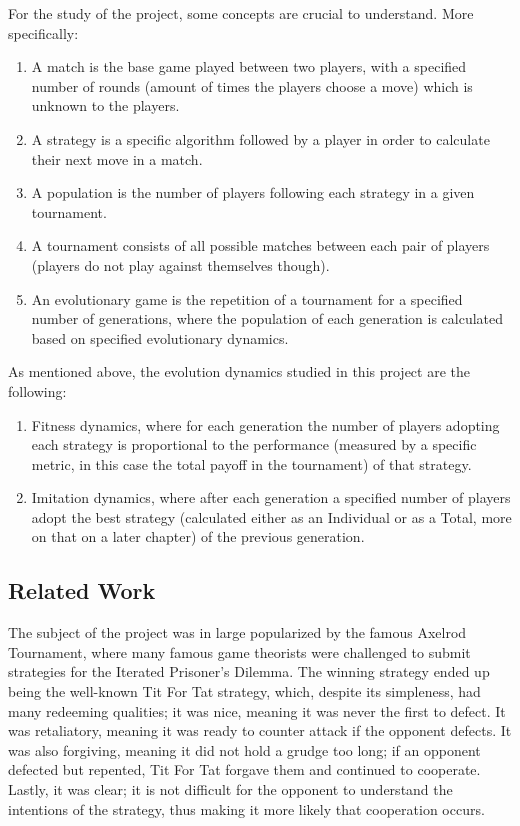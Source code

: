 For the study of the project, some concepts are crucial to understand. More specifically:
\begin{enumerate}
  \item A match is the base game played between two players, with a specified number of rounds (amount of times the players choose a move) which is unknown to the players.
  \item A strategy is a specific algorithm followed by a player in order to calculate their next move in a match.
  \item A population is the number of players following each strategy in a given tournament.
  \item A tournament consists of all possible matches between each pair of players (players do not play against themselves though).
  \item An evolutionary game is the repetition of a tournament for a specified number of generations, where the population of each generation is calculated based on specified evolutionary dynamics.
\end{enumerate}

As mentioned above, the evolution dynamics studied in this project are the following:
\begin{enumerate}
  \item Fitness dynamics, where for each generation the number of players adopting each strategy is proportional to the performance (measured by a specific metric, in this case the total payoff in the tournament) of that strategy.
  \item Imitation dynamics, where after each generation a specified number of players adopt the best strategy (calculated either as an Individual or as a Total, more on that on a later chapter) of the previous generation.
\end{enumerate}

\subsection{Related Work}
The subject of the project was in large popularized by the famous Axelrod Tournament\cite{axelrod1981}\cite{axelrod1988}, where many famous game theorists were challenged to submit strategies for the Iterated Prisoner's Dilemma. The winning strategy ended up being the well-known Tit For Tat strategy, which, despite its simpleness, had many redeeming qualities; it was nice, meaning it was never the first to defect. It was retaliatory, meaning it was ready to counter attack if the opponent defects. It was also forgiving, meaning it did not hold a grudge too long; if an opponent defected but repented, Tit For Tat forgave them and continued to cooperate. Lastly, it was clear; it is not difficult for the opponent to understand the intentions of the strategy, thus making it more likely that cooperation occurs.

